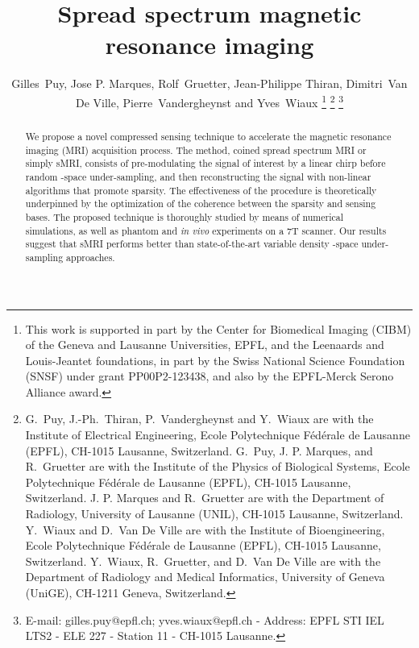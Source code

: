 \documentclass[10pt,draftcls, onecolumn]{IEEEtran}
\begin{document}
\title{Spread spectrum magnetic resonance imaging}
\author{Gilles~Puy, Jose P. Marques, Rolf~Gruetter, Jean-Philippe Thiran, Dimitri~Van De Ville, Pierre~Vandergheynst and Yves~Wiaux
\thanks{This work is supported in part by the Center for Biomedical Imaging (CIBM) of the Geneva and Lausanne Universities, EPFL, and the Leenaards and Louis-Jeantet foundations, in part by the Swiss National Science Foundation (SNSF) under grant PP00P2-123438, and also by the EPFL-Merck Serono Alliance award.}
\thanks{G.~Puy, J.-Ph.~Thiran, P.~Vandergheynst and Y.~Wiaux are with the Institute of Electrical Engineering,  Ecole Polytechnique F{\'e}d{\'e}rale de Lausanne (EPFL), CH-1015 Lausanne, Switzerland. G.~Puy, J. P. Marques, and R.~Gruetter are with the Institute of the Physics of Biological Systems,  Ecole Polytechnique F{\'e}d{\'e}rale de Lausanne (EPFL), CH-1015 Lausanne, Switzerland. J. P. Marques and R.~Gruetter are with the Department of Radiology, University of Lausanne (UNIL), CH-1015 Lausanne, Switzerland. Y.~Wiaux and D.~Van De Ville are with the Institute of Bioengineering,  Ecole Polytechnique F{\'e}d{\'e}rale de Lausanne (EPFL), CH-1015 Lausanne, Switzerland. Y.~Wiaux, R.~Gruetter, and D.~Van De Ville are with the Department of Radiology and Medical Informatics, University of Geneva (UniGE), CH-1211 Geneva, Switzerland.}
\thanks{E-mail: gilles.puy@epfl.ch; yves.wiaux@epfl.ch - Address: EPFL STI IEL LTS2 - ELE 227 - Station 11 - CH-1015 Lausanne.}} 

\maketitle

\begin{abstract}
We propose a novel compressed sensing technique to accelerate the magnetic resonance imaging (MRI) acquisition process. The method, coined spread spectrum MRI or simply sMRI, consists of pre-modulating the signal of interest by a linear chirp before random -space under-sampling, and then reconstructing the signal with non-linear algorithms that promote sparsity. The effectiveness of the procedure is theoretically underpinned by the optimization of the coherence between the sparsity and sensing bases. The proposed technique is thoroughly studied by means of numerical simulations, as well as phantom and \emph{in vivo} experiments on a 7T scanner. Our results suggest that sMRI performs better than state-of-the-art variable density -space under-sampling approaches.
\end{abstract}
\end{document}
